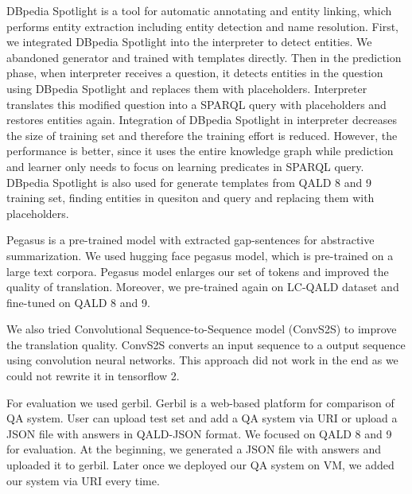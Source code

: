 DBpedia Spotlight \cite{isem2013daiber} is a tool for automatic annotating and entity linking, 
which performs entity extraction including entity detection and name resolution. 
First, we integrated DBpedia Spotlight into the interpreter to detect entities. 
We abandoned generator and trained with templates directly. 
Then in the prediction phase, 
when interpreter receives a question, 
it detects entities in the question using DBpedia Spotlight and replaces them with placeholders.
Interpreter translates this modified question into a SPARQL query with placeholders
and restores entities again. 
Integration of DBpedia Spotlight in interpreter decreases the size of training set
and therefore the training effort is reduced. 
However, the performance is better,
since it uses the entire knowledge graph while prediction
and learner only needs to focus on learning predicates in SPARQL query. 
DBpedia Spotlight is also used for generate templates from QALD 8 and 9 training set,
finding entities in quesiton and query and replacing them with placeholders. 

Pegasus\cite{10.5555/3524938.3525989} is a pre-trained model with extracted gap-sentences for abstractive summarization. 
We used hugging face pegasus model, which is pre-trained on a large text corpora. 
Pegasus model enlarges our set of tokens and improved the quality of translation. 
Moreover, we pre-trained again on LC-QALD dataset and fine-tuned on QALD 8 and 9. 


We also tried Convolutional Sequence-to-Sequence model (ConvS2S) \cite{DBLP:journals/corr/GehringAGYD17} to improve the translation quality.
ConvS2S converts an input sequence to a output sequence using convolution neural networks. 
This approach did not work in the end
as we could not rewrite it in tensorflow 2. 

For evaluation we used gerbil\cite{gerbil}.
Gerbil is a web-based platform for comparison of QA system. 
User can upload test set and add a QA system via URI or upload a JSON file with answers in QALD-JSON format. 
We focused on QALD 8 and 9 for evaluation. 
At the beginning, we generated a JSON file with answers and uploaded it to gerbil. 
Later once we deployed our QA system on VM, we added our system via URI every time. 
